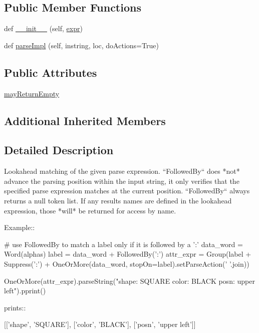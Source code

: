 \subsection*{Public Member Functions}
\begin{DoxyCompactItemize}
\item 
def \hyperlink{classpyparsing_1_1FollowedBy_aba3c2d43e2160bc634d9ea8e25818dcf}{\+\_\+\+\_\+init\+\_\+\+\_\+} (self, \hyperlink{classpyparsing_1_1ParseElementEnhance_a0139048279aeac38804a10d131d3c340}{expr})
\item 
def \hyperlink{classpyparsing_1_1FollowedBy_ad27ba05c16438173db9dac55703fbc8a}{parse\+Impl} (self, instring, loc, do\+Actions=True)
\end{DoxyCompactItemize}
\subsection*{Public Attributes}
\begin{DoxyCompactItemize}
\item 
\hyperlink{classpyparsing_1_1FollowedBy_ac42f8db8de3f925e2f772a3aa9844068}{may\+Return\+Empty}
\end{DoxyCompactItemize}
\subsection*{Additional Inherited Members}


\subsection{Detailed Description}
\begin{DoxyVerb}Lookahead matching of the given parse expression.
``FollowedBy`` does *not* advance the parsing position within
the input string, it only verifies that the specified parse
expression matches at the current position.  ``FollowedBy``
always returns a null token list. If any results names are defined
in the lookahead expression, those *will* be returned for access by
name.

Example::

    # use FollowedBy to match a label only if it is followed by a ':'
    data_word = Word(alphas)
    label = data_word + FollowedBy(':')
    attr_expr = Group(label + Suppress(':') + OneOrMore(data_word, stopOn=label).setParseAction(' '.join))

    OneOrMore(attr_expr).parseString("shape: SQUARE color: BLACK posn: upper left").pprint()

prints::

    [['shape', 'SQUARE'], ['color', 'BLACK'], ['posn', 'upper left']]
\end{DoxyVerb}
 


